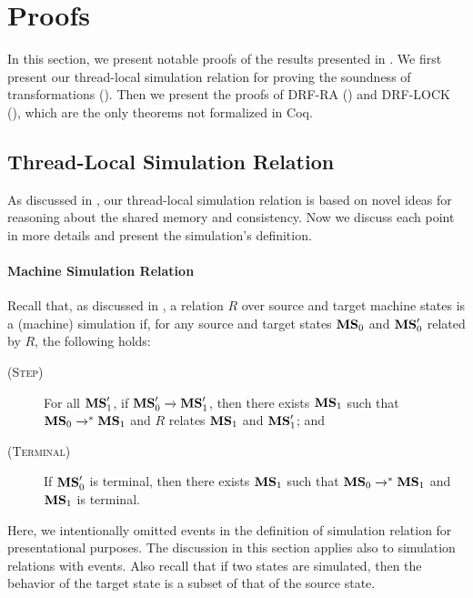 \section{Proofs}
\label{sec:relaxed:proofs}

In this section, we present notable proofs of the results presented in .  We first
present our thread-local simulation relation for proving the soundness of transformations
().  Then we present the proofs of DRF-RA
() and DRF-LOCK (), which are the
only theorems not formalized in Coq.


\subsection{Thread-Local Simulation Relation}
\label{sec:relaxed:proofs:simulation}

As discussed in , our thread-local simulation relation is based on novel
ideas for reasoning about the shared memory and consistency.  Now we discuss each point in more
details and present the simulation's definition.


\paragraph{Machine Simulation Relation}

Recall that, as discussed in , a relation $R$ over source and
target machine states is a (machine) simulation if, for any source and target states ${\mathbf{MS}}_0$ and
${\mathbf{MS}}'_0$ related by $R$, the following holds:
\begin{description}
\item[\textsc{(Step)}] For all ${\mathbf{MS}}'_1$, if ${\mathbf{MS}}'_0 \xrightarrow{} {\mathbf{MS}}'_1$, then there exists
  ${\mathbf{MS}}_1$ such that ${\mathbf{MS}}_0 \xrightarrow{}^* {\mathbf{MS}}_1$ and $R$ relates ${\mathbf{MS}}_1$ and ${\mathbf{MS}}'_1$;
  and
\item[\textsc{(Terminal)}] If ${\mathbf{MS}}'_0$ is terminal, then there exists ${\mathbf{MS}}_1$ such that
  ${\mathbf{MS}}_0 \xrightarrow{}^* {\mathbf{MS}}_1$ and ${\mathbf{MS}}_1$ is terminal.
\end{description}
%
Here, we intentionally omitted events in the definition of simulation relation for presentational
purposes.  The discussion in this section applies also to simulation relations with events.  Also
recall that if two states are simulated, then the behavior of the target state is a subset of that
of the source state.



